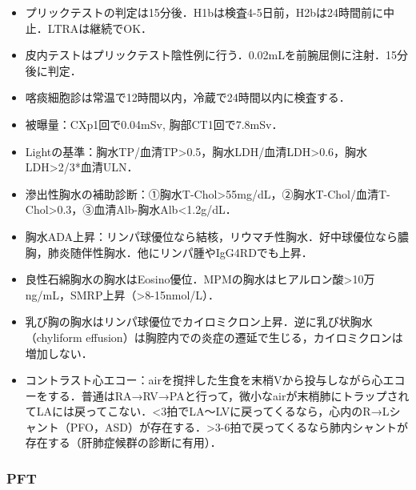 \begin{itemize}
\item プリックテストの判定は15分後．H1bは検査4-5日前，H2bは24時間前に中止．LTRAは継続でOK．
\item 皮内テストはプリックテスト陰性例に行う．0.02mLを前腕屈側に注射．15分後に判定．
\item 喀痰細胞診は常温で12時間以内，冷蔵で24時間以内に検査する．
\item 被曝量：CXp1回で0.04mSv, 胸部CT1回で7.8mSv．
\item Lightの基準：胸水TP/血清TP>0.5，胸水LDH/血清LDH>0.6，胸水LDH>2/3*血清ULN．
\item 滲出性胸水の補助診断：①胸水T-Chol>55mg/dL，②胸水T-Chol/血清T-Chol>0.3，③血清Alb-胸水Alb<1.2g/dL．
\item 胸水ADA上昇：リンパ球優位なら結核，リウマチ性胸水．好中球優位なら膿胸，肺炎随伴性胸水．他にリンパ腫やIgG4RDでも上昇．
\item 良性石綿胸水の胸水はEosino優位．MPMの胸水はヒアルロン酸>10万ng/mL，SMRP上昇（>8-15nmol/L）．
\item 乳び胸の胸水はリンパ球優位でカイロミクロン上昇．逆に乳び状胸水（chyliform effusion）は胸腔内での炎症の遷延で生じる，カイロミクロンは増加しない．
\item コントラスト心エコー：airを撹拌した生食を末梢Vから投与しながら心エコーをする．普通はRA→RV→PAと行って，微小なairが末梢肺にトラップされてLAには戻ってこない．<3拍でLA〜LVに戻ってくるなら，心内のR→Lシャント（PFO，ASD）が存在する．>3-6拍で戻ってくるなら肺内シャントが存在する（肝肺症候群の診断に有用）．
\end{itemize}


\subsubsection{PFT}

